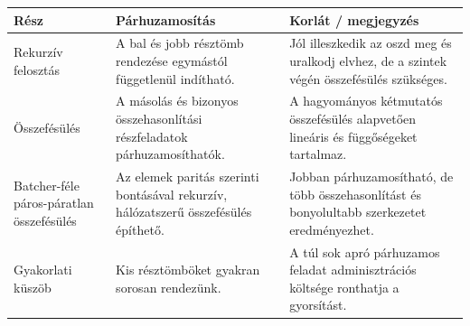 \begin{tabularx}{\textwidth}{L{31mm}L{48mm}X}
\toprule
\textbf{Rész} & \textbf{Párhuzamosítás} & \textbf{Korlát / megjegyzés} \\
\midrule
Rekurzív felosztás & A bal és jobb résztömb rendezése egymástól függetlenül indítható. & Jól illeszkedik az oszd meg és uralkodj elvhez, de a szintek végén összefésülés szükséges. \\
Összefésülés & A másolás és bizonyos összehasonlítási részfeladatok párhuzamosíthatók. & A hagyományos kétmutatós összefésülés alapvetően lineáris és függőségeket tartalmaz. \\
Batcher-féle páros-páratlan összefésülés & Az elemek paritás szerinti bontásával rekurzív, hálózatszerű összefésülés építhető. & Jobban párhuzamosítható, de több összehasonlítást és bonyolultabb szerkezetet eredményezhet. \\
Gyakorlati küszöb & Kis résztömböket gyakran sorosan rendezünk. & A túl sok apró párhuzamos feladat adminisztrációs költsége ronthatja a gyorsítást. \\
\bottomrule
\end{tabularx}
